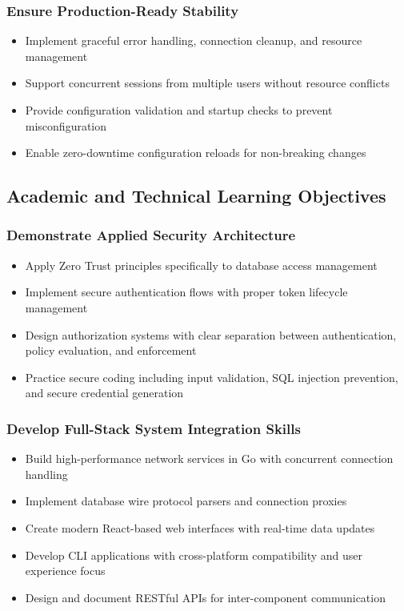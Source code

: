 \subsubsection{Ensure Production-Ready Stability}
\begin{itemize}
    \item Implement graceful error handling, connection cleanup, and resource management
    \item Support concurrent sessions from multiple users without resource conflicts
    \item Provide configuration validation and startup checks to prevent misconfiguration
    \item Enable zero-downtime configuration reloads for non-breaking changes
\end{itemize}

\subsection{Academic and Technical Learning Objectives}

\subsubsection{Demonstrate Applied Security Architecture}
\begin{itemize}
    \item Apply Zero Trust principles specifically to database access management
    \item Implement secure authentication flows with proper token lifecycle management
    \item Design authorization systems with clear separation between authentication, policy evaluation, and enforcement
    \item Practice secure coding including input validation, SQL injection prevention, and secure credential generation
\end{itemize}

\subsubsection{Develop Full-Stack System Integration Skills}
\begin{itemize}
    \item Build high-performance network services in Go with concurrent connection handling
    \item Implement database wire protocol parsers and connection proxies
    \item Create modern React-based web interfaces with real-time data updates
    \item Develop CLI applications with cross-platform compatibility and user experience focus
    \item Design and document RESTful APIs for inter-component communication
\end{itemize}


